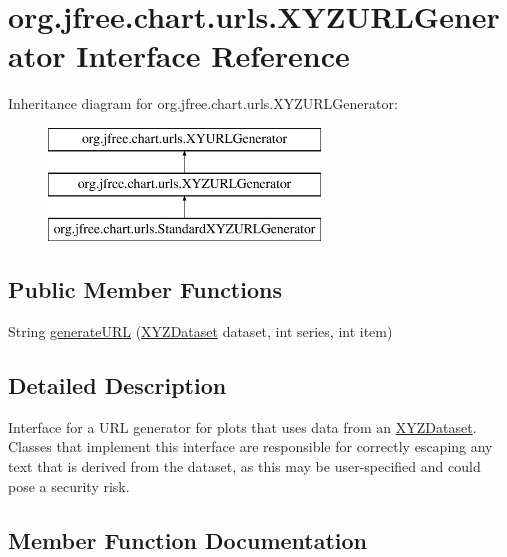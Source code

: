 \hypertarget{interfaceorg_1_1jfree_1_1chart_1_1urls_1_1_x_y_z_u_r_l_generator}{}\section{org.\+jfree.\+chart.\+urls.\+X\+Y\+Z\+U\+R\+L\+Generator Interface Reference}
\label{interfaceorg_1_1jfree_1_1chart_1_1urls_1_1_x_y_z_u_r_l_generator}
Inheritance diagram for org.\+jfree.\+chart.\+urls.\+X\+Y\+Z\+U\+R\+L\+Generator\+:\begin{figure}[H]
\begin{center}
\leavevmode
\includegraphics[height=3.000000cm]{interfaceorg_1_1jfree_1_1chart_1_1urls_1_1_x_y_z_u_r_l_generator}
\end{center}
\end{figure}
\subsection*{Public Member Functions}
\begin{DoxyCompactItemize}
\item 
String \mbox{\hyperlink{interfaceorg_1_1jfree_1_1chart_1_1urls_1_1_x_y_z_u_r_l_generator_af81e1e5eceeeece614b4c9c2b7f04f7f}{generate\+U\+RL}} (\mbox{\hyperlink{interfaceorg_1_1jfree_1_1data_1_1xy_1_1_x_y_z_dataset}{X\+Y\+Z\+Dataset}} dataset, int series, int item)
\end{DoxyCompactItemize}


\subsection{Detailed Description}
Interface for a U\+RL generator for plots that uses data from an \mbox{\hyperlink{}{X\+Y\+Z\+Dataset}}. Classes that implement this interface are responsible for correctly escaping any text that is derived from the dataset, as this may be user-\/specified and could pose a security risk. 

\subsection{Member Function Documentation}
\mbox{\label{interfaceorg_1_1jfree_1_1chart_1_1urls_1_1_x_y_z_u_r_l_generator_af81e1e5eceeeece614b4c9c2b7f04f7f}} 
